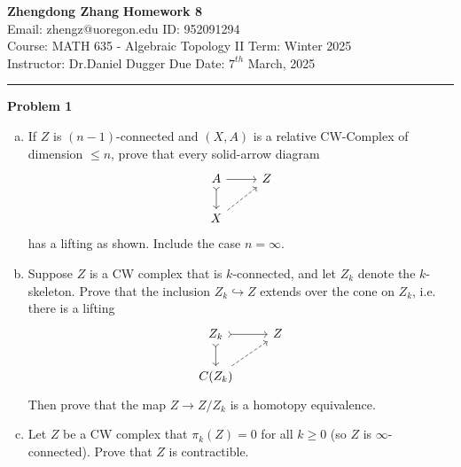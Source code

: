\documentclass[a4paper, 12pt]{article}
\newenvironment{problem}[2][Problem]
    { \begin{mdframed}[backgroundcolor=gray!20] \textbf{#1 #2} \\}
    {  \end{mdframed}}
\begin{document}
\noindent
\large\textbf{Zhengdong Zhang} \hfill \textbf{Homework 8}   \\
Email: zhengz@uoregon.edu \hfill ID: 952091294 \\
\normalsize Course: MATH 635 - Algebraic Topology II \hfill Term: Winter 2025\\
Instructor: Dr.Daniel Dugger \hfill Due Date: $7^{th}$ March, 2025 \\
\noindent\rule{7in}{2.8pt}

\begin{problem}{1}
\begin{enumerate}[(a)]
\item If \(Z\) is \((n-1)\)-connected and \((X,A)\) is a relative CW-Complex of dimension \(\leq n\), prove that every solid-arrow diagram 
\[\begin{tikzcd}
	A & Z \\
	X
	\arrow[from=1-1, to=1-2]
	\arrow[tail, from=1-1, to=2-1]
	\arrow[dashed, from=2-1, to=1-2]
\end{tikzcd}\]
has a lifting as shown. Include the case \(n=\infty\). 
\item Suppose \(Z\) is a CW complex that is \(k\)-connected, and let \(Z_k\) denote the \(k\)-skeleton. Prove that the inclusion \(Z_k\hookrightarrow Z\) extends over the cone on \(Z_k\), i.e. there is a lifting 
\[\begin{tikzcd}
	{Z_k} & Z \\
	{C(Z_k)}
	\arrow[tail, from=1-1, to=1-2]
	\arrow[tail, from=1-1, to=2-1]
	\arrow[dashed, from=2-1, to=1-2]
\end{tikzcd}\]
Then prove that the map \(Z\rightarrow Z/Z_k\) is a homotopy equivalence. 
\item Let \(Z\) be a CW complex that \(\pi_k(Z)=0\) for all \(k\geq 0\) (so \(Z\) is \(\infty\)-connected). Prove that \(Z\) is contractible.
\end{enumerate}
\end{problem}
\end{document}
